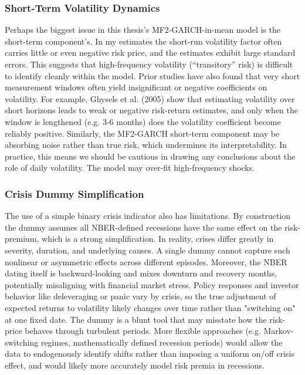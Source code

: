 \documentclass[12pt]{article}
\begin{document}
\subsubsection{Short-Term Volatility Dynamics}
Perhaps the biggest issue in this thesis's MF2-GARCH-in-mean model is the short-term component's. In my estimates the short-run volatility factor often carries little or even negative risk price, and the estimates exhibit large standard errors. This suggests that high-frequency volatility (“transitory” risk) is difficult to identify cleanly within the model. Prior studies have also found that very short measurement windows often yield insignificant or negative coefficients on volatility. For example, Ghysels et al. (2005) show that estimating volatility over short horizons leads to weak or negative risk-return estimates, and only when the window is lengthened (e.g. 3-6 months) does the volatility coefficient become reliably positive. Similarly, the MF2-GARCH short-term component may be absorbing noise rather than true risk, which undermines its interpretability. In practice, this means we should be cautious in drawing any conclusions about the role of daily volatility. The model may over-fit high-frequency shocks.
\subsubsection{Crisis Dummy Simplification}
The use of a simple binary crisis indicator also has limitations. By construction the dummy assumes all NBER-defined recessions have the same effect on the risk-premium, which is a strong simplification. In reality, crises differ greatly in severity, duration, and underlying causes. A single dummy cannot capture such nonlinear or asymmetric effects across different episodes. Moreover, the NBER dating itself is backward-looking and mixes downturn and recovery months, potentially misaligning with financial market stress. Policy responses and investor behavior like deleveraging or panic vary by crisis, so the true adjustment of expected returns to volatility likely changes over time rather than "switching on" at one fixed date. The dummy is a blunt tool that may misstate how the risk-price behaves through turbulent periods. More flexible approaches (e.g. Markov-switching regimes, mathematically defined recession periods) would allow the data to endogenously identify shifts rather than imposing a uniform on/off crisis effect, and would likely more accurately model risk premia in recessions.
\end{document}
